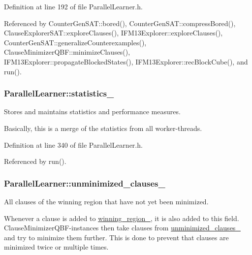 Definition at line 192 of file Parallel\-Learner.\-h.



Referenced by Counter\-Gen\-S\-A\-T\-::bored(), Counter\-Gen\-S\-A\-T\-::compress\-Bored(), Clause\-Explorer\-S\-A\-T\-::explore\-Clauses(), I\-F\-M13\-Explorer\-::explore\-Clauses(), Counter\-Gen\-S\-A\-T\-::generalize\-Counterexamples(), Clause\-Minimizer\-Q\-B\-F\-::minimize\-Clauses(), I\-F\-M13\-Explorer\-::propagate\-Blocked\-States(), I\-F\-M13\-Explorer\-::rec\-Block\-Cube(), and run().

\hypertarget{classParallelLearner_abfb2e28ec1a0f8775d3f14f75415a8bd}{
\subsubsection[{statistics\-\_\-}]{ Parallel\-Learner\-::statistics\-\_\-\hspace{0.3cm}{\ttfamily [protected]}}}\label{classParallelLearner_abfb2e28ec1a0f8775d3f14f75415a8bd}


Stores and maintains statistics and performance measures. 

Basically, this is a merge of the statistics from all worker-\/threads. 

Definition at line 340 of file Parallel\-Learner.\-h.



Referenced by run().

\hypertarget{classParallelLearner_aba6b363071d9a39d7b368cec5b629c25}{
\subsubsection[{unminimized\-\_\-clauses\-\_\-}]{ Parallel\-Learner\-::unminimized\-\_\-clauses\-\_\-}}\label{classParallelLearner_aba6b363071d9a39d7b368cec5b629c25}


All clauses of the winning region that have not yet been minimized. 

Whenever a clause is added to \hyperlink{classParallelLearner_a7c8383543ff98d7a0356a237756dcdd6}{winning\-\_\-region\-\_\-}, it is also added to this field. Clause\-Minimizer\-Q\-B\-F-\/instances then take clauses from \hyperlink{classParallelLearner_aba6b363071d9a39d7b368cec5b629c25}{unminimized\-\_\-clauses\-\_\-} and try to minimize them further. This is done to prevent that clauses are minimized twice or multiple times. 


